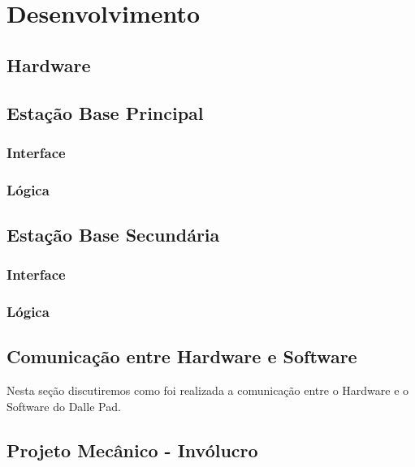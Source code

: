 
\chapter{Desenvolvimento}
\label{chap:desenvolvimento}



    \section{Hardware}



    \section{Estação Base Principal}



        \subsection{Interface}



        \subsection{Lógica}



    \section{Estação Base Secundária}



        \subsection{Interface}



        \subsection{Lógica}



    \section{Comunicação entre Hardware e Software}

        Nesta seção discutiremos como foi realizada a comunicação entre o Hardware e o Software do Dalle Pad.

    \section{Projeto Mecânico - Invólucro}

        